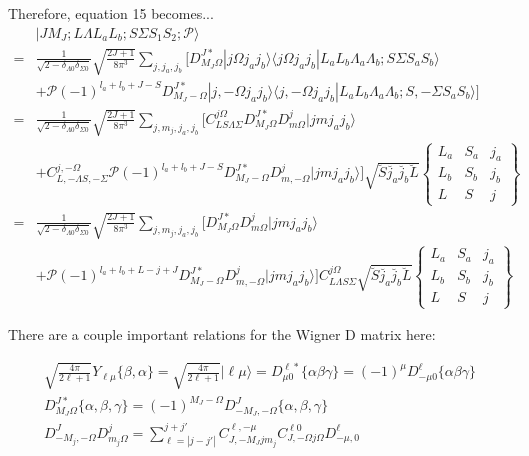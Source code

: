 \documentclass[prl, longbibliography, aps, 10pt]{revtex4-2}
\begin{document}
Therefore, equation 15 becomes...
\begin{equation}
\begin{split}
&|J M_J; L \Lambda L_a L_b; S \Sigma  S_1 S_2; \mathcal{P} \rangle
\\
=&\frac{1}{\sqrt{2-\delta_{\Lambda 0}\delta_{\Sigma 0}}}
\sqrt{\frac{2J+1}{8\pi^3}}
\sum_{j, j_a, j_b} 
\bigg[D^{J*}_{M_J\Omega}
|j\Omega j_a j_b\rangle\langle j\Omega j_a j_b | L_a L_b \Lambda_a \Lambda_b; S\Sigma S_a S_b\rangle
\\
&+\mathcal{P}(-1)^{l_a+l_b+J-S}D^{J*}_{M_J-\Omega}
|j,-\Omega j_a j_b\rangle\langle j,-\Omega j_a j_b | L_a L_b \Lambda_a \Lambda_b; S,-\Sigma S_a S_b\rangle
\bigg]
\\
=&\frac{1}{\sqrt{2-\delta_{\Lambda 0}\delta_{\Sigma 0}}}
\sqrt{\frac{2J+1}{8\pi^3}}
\sum_{j, m_j, j_a, j_b} \bigg[
C_{L S \Lambda \Sigma}^{j \Omega}
D^{J*}_{M_J\Omega}D^j_{m \Omega}
|j m j_a j_b\rangle
\\
&+
C_{L,-\Lambda S,-\Sigma}^{j,-\Omega}
\mathcal{P}(-1)^{l_a+l_b+J-S}D^{J*}_{M_J-\Omega}
D^j_{m,-\Omega}|j m j_a j_b\rangle \bigg]
\sqrt{\breve{S}\breve{j_a}\breve{j_b}\breve{L}}
\begin{Bmatrix}
L_a & S_a & j_a\\
L_b & S_b & j_b\\
L & S & j
\end{Bmatrix}
\\
=&\frac{1}{\sqrt{2-\delta_{\Lambda 0}\delta_{\Sigma 0}}}
\sqrt{\frac{2J+1}{8\pi^3}}
\sum_{j, m_j, j_a, j_b} \bigg[
D^{J*}_{M_J\Omega}D^j_{m \Omega}
|j m j_a j_b\rangle
\\
&+
\mathcal{P}(-1)^{l_a+l_b+L-j+J}D^{J*}_{M_J-\Omega}
D^j_{m,-\Omega}|j m j_a j_b\rangle \bigg]
C_{L\Lambda S\Sigma}^{j\Omega}\sqrt{\breve{S}\breve{j_a}\breve{j_b}\breve{L}}
\begin{Bmatrix}
L_a & S_a & j_a\\
L_b & S_b & j_b\\
L & S & j
\end{Bmatrix}
\end{split}
\end{equation}

There are a couple important relations for the Wigner D matrix here:

\begin{equation}
\begin{split}
\sqrt{\frac{4\pi}{2\ell+1}}Y_{\ell \mu}\{\beta, \alpha\}=\sqrt{\frac{4\pi}{2\ell+1}}|\ell\mu\rangle
=D^{\ell *}_{\mu 0} \{\alpha \beta \gamma\}
=(-1)^{\mu}D^{\ell}_{-\mu 0} \{\alpha \beta \gamma\}
\\
D^{J*}_{M_J \Omega}\{\alpha,\beta,\gamma\} 
=(-1)^{M_J-\Omega} D_{-M_J,-\Omega}^J\{\alpha,\beta,\gamma\}
\\
D_{-M_j,-\Omega}^{J}
D_{m_j \Omega}^{j}
= \sum_{\ell=|j-j'|}^{j+j'}
C_{J,-M_J j m_j}^{\ell, -\mu}
C_{J,-\Omega j \Omega}^{\ell 0}
D^{\ell}_{-\mu,0}
\end{split}
\end{equation}
\end{document}

